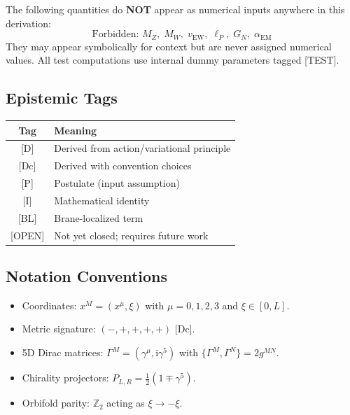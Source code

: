 \documentclass[11pt,a4paper]{article}
\newcommand{\ii}{\mathrm{i}}
\begin{document}
The following quantities do \textbf{NOT} appear as numerical inputs anywhere in this derivation:
\begin{equation}
\boxed{\text{Forbidden: } M_Z,\; M_W,\; v_{\text{EW}},\; \ell_P,\; G_N,\; \alpha_{\text{EM}}}
\label{eq:forbidden}
\end{equation}
They may appear symbolically for context but are never assigned numerical values. All
test computations use internal dummy parameters tagged [TEST].

\subsection{Epistemic Tags}

\begin{center}
\begin{tabular}{cl}
\toprule
Tag & Meaning \\
\midrule
{[D]} & Derived from action/variational principle \\
{[Dc]} & Derived with convention choices \\
{[P]} & Postulate (input assumption) \\
{[I]} & Mathematical identity \\
{[BL]} & Brane-localized term \\
{[OPEN]} & Not yet closed; requires future work \\
\bottomrule
\end{tabular}
\end{center}

\subsection{Notation Conventions}

\begin{itemize}
\item Coordinates: $x^M = (x^\mu, \xi)$ with $\mu = 0,1,2,3$ and $\xi \in [0,L]$.
\item Metric signature: $(-, +, +, +, +)$ [Dc].
\item 5D Dirac matrices: $\Gamma^M = (\gamma^\mu, \ii\gamma^5)$ with $\{\Gamma^M, \Gamma^N\} = 2g^{MN}$.
\item Chirality projectors: $P_{L,R} = \frac{1}{2}(1 \mp \gamma^5)$.
\item Orbifold parity: $\mathbb{Z}_2$ acting as $\xi \to -\xi$.
\end{itemize}

\end{document}

